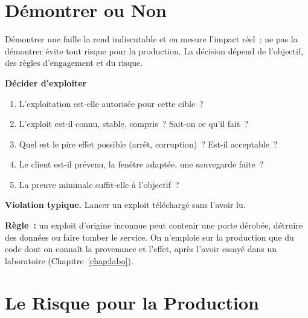 \section{Démontrer ou Non}
\label{sec:c08-decider}

Démontrer une faille la rend indiscutable et en mesure l'impact réel~; ne
pas la démontrer évite tout risque pour la production. La décision dépend
de l'objectif, des règles d'engagement et du risque.

\begin{boxprocedure}
\textbf{Décider d'exploiter}
\begin{enumerate}
    \item L'exploitation est-elle autorisée pour cette cible~?
    \item L'exploit est-il connu, stable, compris~? Sait-on ce qu'il fait~?
    \item Quel est le pire effet possible (arrêt, corruption)~? Est-il
          acceptable~?
    \item Le client est-il prévenu, la fenêtre adaptée, une sauvegarde
          faite~?
    \item La preuve minimale suffit-elle à l'objectif~?
\end{enumerate}
\end{boxprocedure}

\begin{boxalert}
\textbf{Violation typique.} Lancer un exploit téléchargé sans l'avoir lu.

\smallskip
\textbf{Règle~:} un exploit d'origine inconnue peut contenir une porte
dérobée, détruire des données ou faire tomber le service. On n'emploie sur
la production que du code dont on connaît la provenance et l'effet, après
l'avoir essayé dans un laboratoire (Chapitre~\ref{chap:labo}).
\end{boxalert}

\section{Le Risque pour la Production}
\label{sec:c08-risque}

